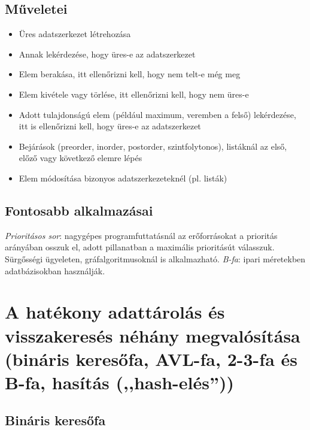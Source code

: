 \documentclass[margin=0px]{article}
\begin{document}
	\subsection{Műveletei}
	
	\begin{itemize}
		\item Üres adatszerkezet létrehozása
		\item Annak lekérdezése, hogy üres-e az adatszerkezet
		\item Elem berakása, itt ellenőrizni kell, hogy nem telt-e még meg
		\item Elem kivétele vagy törlése, itt ellenőrizni kell, hogy nem üres-e
		\item Adott tulajdonságú elem (például maximum, veremben a felső) lekérdezése, itt is ellenőrizni kell, hogy üres-e az adatszerkezet
		\item Bejárások (preorder, inorder, postorder, szintfolytonos), listáknál az első, előző vagy következő elemre lépés
		\item Elem módosítása bizonyos adatszerkezeteknél (pl. listák)
	\end{itemize}
	
	\subsection{Fontosabb alkalmazásai}
	
	\textit{Prioritásos sor}: nagygépes programfuttatásnál az erőforrásokat a prioritás arányában osszuk el, adott pillanatban a maximális prioritásút válasszuk. Sürgősségi ügyeleten, gráfalgoritmusoknál is alkalmazható.
	\textit{B-fa}: ipari méretekben adatbázisokban használják.
	
	\section{A hatékony adattárolás és visszakeresés néhány megvalósítása (bináris keresőfa, AVL-fa, 2-3-fa és B-fa, hasítás (,,hash-elés”))}
	
	\subsection{Bináris keresőfa}
	
\end{document}

